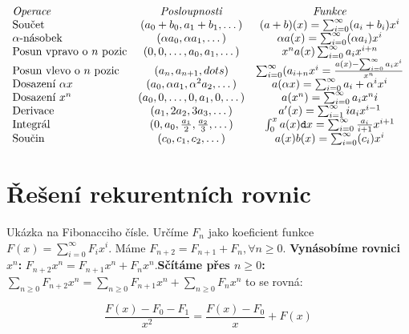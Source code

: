$$
\begin{array}{l c c}
	\text{\textit{Operace}}                & \text{\textit{Posloupnosti}}                     & \text{\textit{Funkce}} \\
	\text{Součet}                          & (a_0+b_0, a_1+b_1, \dots)                        & (a+b)(x) = \sum_{i=0}^{\infty}(a_i+b_i)x^i \\
	\alpha\text{-násobek}                  & (\alpha a_0, \alpha a_1, \dots)                  & \alpha a(x) = \sum_{i=0}^{\infty}(\alpha a_i)x^i \\
	\text{Posun vpravo o } n \text{ pozic} & (0,0,\dots ,a_0, a_1, \dots)                     & x^na(x)\sum_{i=0}^{\infty}a_ix^{i+n} \\
	\text{Posun vlevo o } n \text{ pozic}  & (a_n, a_{n+1}, dots )                            & \sum_{i=0}^{\infty}(a_{i+n}x^i = \frac{a(x) - \sum_{i=0}^{\infty}a_ix^i}{x^n} \\
	\text{Dosazení } \alpha x              & (a_0, \alpha a_1, \alpha^2 a_2, \dots)           & a(\alpha x) = \sum_{i=0}^{\infty}a_i+ \alpha^i x^i \\
	\text{Dosazení } x^n                   & (a_0, 0, \dots, 0, a_1, 0, \dots)                & a(x^n) = \sum_{i=0}^{\infty}a_ix^ni \\
	\text{Derivace}                        & (a_1, 2a_2, 3a_3, \dots)                         & a'(x) = \sum_{i=1}^{\infty}ia_ix^{i-1} \\
	\text{Integrál}                        & (0, a_0, \frac{a_1}{2}, \frac{a_2}{3}, \dots)    & \int_{0}^{x} a(x) \mathtt{d} x = \sum_{i=0}^{\infty}\frac{a_i}{i+1}x^{i+1} \\
	\text{Součin}                          & (c_0, c_1, c_2, \dots)                           & a(x)b(x) = \sum_{i=0}^{\infty}(c_i)x^i \\
\end{array}
$$
\section{Řešení rekurentních rovnic}

Ukázka na Fibonacciho čísle. Určíme $F_n$ jako koeficient funkce $F(x)=\sum_{i=0}^{\infty}F_ix^i$. Máme $F_{n+2} = F_{n+1} + F_{n}, \forall n\geq 0$. \textbf{Vynásobíme rovnici $x^n$:} $F_{n+2} x^n= F_{n+1} x^n + F_{n} x^n$.\textbf{Sčítáme přes $n \geq 0$:} $\sum_{n \geq 0} F_{n+2} x^n= \sum_{n \geq 0} F_{n+1} x^n + \sum_{n \geq 0} F_{n} x^n$ to se rovná:

$$
\frac{F(x)-F_0 - F_1}{x^2} = \frac{F(x)-F_0}{x} +F(x)
$$

